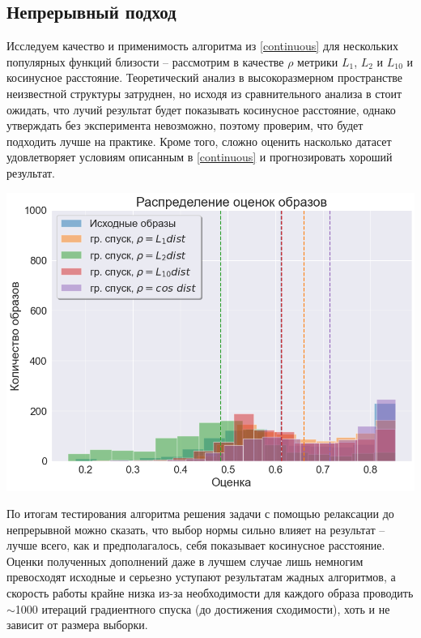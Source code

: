 \documentclass[a4paper,14pt]{extarticle}
\begin{document}
			\subsection{Непрерывный подход}\label{continuous test}
			Исследуем качество и применимость алгоритма из \ref{continuous} для нескольких популярных функций близости -- рассмотрим в качестве $\rho$ метрики $L_1$, $L_2$ и $L_{10}$ и косинусное расстояние. Теоретический анализ в высокоразмерном пространстве неизвестной структуры затруднен, но исходя из сравнительного анализа в \cite{shirkhorshidi2015comparison} стоит ожидать, что лучий результат будет показывать косинусное расстояние, однако утверждать без эксперимента невозможно, поэтому проверим, что будет подходить лучше на практике. Кроме того, сложно оценить насколько датасет удовлетворяет условиям описанным в \ref{continuous} и прогнозировать хороший результат.
			
			\begin{center}
				\includegraphics[scale = 0.6]{../figures/backprop_at_least_5_subset1000.png}
			\end{center}
			По итогам тестирования алгоритма решения задачи с помощью релаксации до непрерывной можно сказать, что выбор нормы сильно влияет на результат -- лучше всего, как и предполагалось, себя показывает косинусное расстояние. Оценки полученных дополнений даже в лучшем случае лишь немногим превосходят исходные и серьезно уступают результатам жадных алгоритмов, а скорость работы крайне низка из-за необходимости для каждого образа проводить $\sim$1000 итераций градиентного спуска (до достижения сходимости), хоть и не зависит от размера выборки.
			
\end{document}
